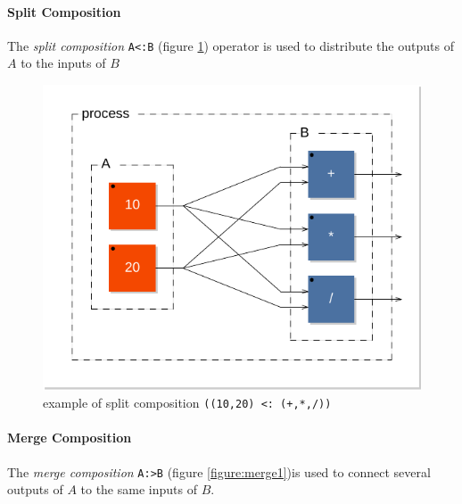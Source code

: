 \documentclass[a4paper]{book}
\begin{document}
\paragraph{Split Composition}
The \emph{split composition}  \lstinline$A<:B$ (figure \ref{figure:split1}) operator is used to distribute the outputs
of $A$ to the inputs of $B$

\begin{figure}[h]
\centering 
\includegraphics[scale=0.7]{images/split1} 
\caption{example of split composition   \lstinline'((10,20) <: (+,*,/))'}  
\label{figure:split1}
\end{figure}


\paragraph{Merge Composition}
The \emph{merge composition}  \lstinline$A:>B$ (figure \ref{figure:merge1})is used to connect several outputs
of  $A$ to the same inputs of $B$. 
\end{document}
